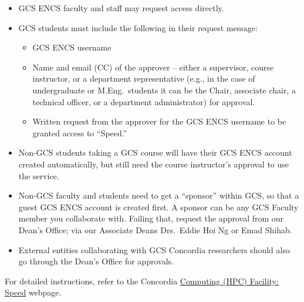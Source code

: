 \begin{itemize}
	\item GCS ENCS faculty and staff may request access directly.
	\item GCS students must include the following in their request message:
	\begin{itemize}
		\item GCS ENCS username
		\item Name and email (CC) of the approver -- either a supervisor, course instructor,
		or a department representative (e.g., in the case of undergraduate or M.Eng.\ students it
		can be the Chair, associate chair, a technical officer, or a department administrator) for approval.
		\item Written request from the approver for the GCS ENCS username to be granted access to ``Speed.''
	\end{itemize}
	\item Non-GCS students taking a GCS course will have their GCS ENCS account created automatically, but still need the course instructor's approval to use the service.
	\item Non-GCS faculty and students need to get a ``sponsor'' within GCS, so that a guest GCS ENCS account is created first. A sponsor can be any GCS Faculty member
	you collaborate with. Failing that, request the approval from our Dean's Office;
	via our Associate Deans Drs.~Eddie Hoi Ng or Emad Shihab.
	\item External entities collaborating with GCS Concordia researchers should also go through the Dean's Office for approvals.
\end{itemize}

For detailed instructions, refer to the Concordia
\href{https://www.concordia.ca/ginacody/aits/speed.html}{Computing (HPC) Facility: Speed} webpage.
